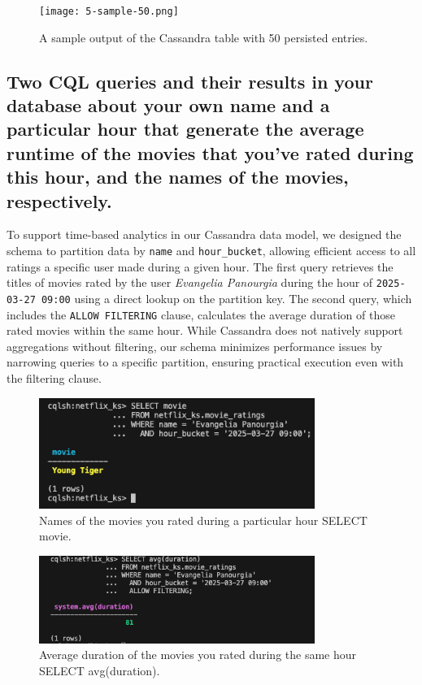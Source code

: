 \documentclass[a4paper,11pt]{article}
\theoremstyle{mytheor}
\begin{document}
\begin{figure}[h]
    \centering
    \texttt{[image: 5-sample-50.png]} %
    \caption{A sample output of the Cassandra table with 50 persisted entries.}
    \label{fig:cassandra-sample}
\end{figure}

\subsection*{Two CQL queries and their results in your database about your own name and a particular
hour that generate the average runtime of the movies that you’ve rated during this hour, and
the names of the movies, respectively.}

To support time-based analytics in our Cassandra data model, we designed the schema to partition data by \texttt{name} and \texttt{hour\_bucket}, allowing efficient access to all ratings a specific user made during a given hour. The first query retrieves the titles of movies rated by the user \textit{Evangelia Panourgia} during the hour of \texttt{2025-03-27 09:00} using a direct lookup on the partition key. The second query, which includes the \texttt{ALLOW FILTERING} clause, calculates the average duration of those rated movies within the same hour. While Cassandra does not natively support aggregations without filtering, our schema minimizes performance issues by narrowing queries to a specific partition, ensuring practical execution even with the filtering clause.


\begin{figure}[H]
    \centering
    \includegraphics[width=0.8\textwidth]{q1.png} %
    \caption{ Names of the movies you rated during a particular hour
SELECT movie.}
    \label{fig:cassandra-sample}
\end{figure}


\begin{figure}[H]
    \centering
    \includegraphics[width=0.8\textwidth]{q2.png} %
    \caption{Average duration of the movies you rated during the same hour
SELECT avg(duration).}
    \label{fig:cassandra-sample}
\end{figure}
\end{document}
